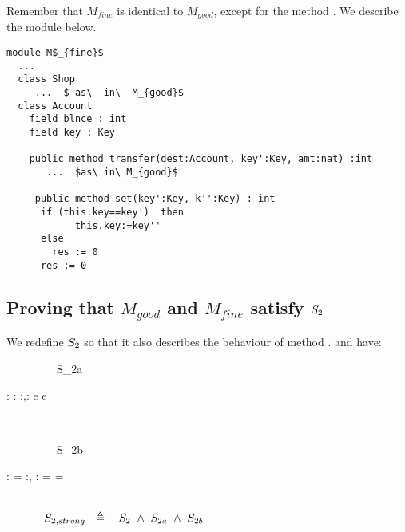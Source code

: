 \noindent
Remember that $M_{fine}$ is identical to $M_{good}$, except for the method . We describe the module below.

\begin{lstlisting}[mathescape=true, language=Chainmail, frame=lines]
module M$_{fine}$
  ...   
  class Shop
     ...  $ as\  in\  M_{good}$
  class Account
    field blnce : int 
    field key : Key
    
    public method transfer(dest:Account, key':Key, amt:nat) :int
       ...  $as\ in\ M_{good}$
	  
     public method set(key':Key, k'':Key) : int
      if (this.key==key')  then
      		this.key:=key''
      else 
        res := 0
      res := 0
\end{lstlisting}

\subsection{Proving that $M_{good}$ and $M_{fine}$ satisfy  $S_2$}
\label{s:extend:spec}

We redefine $S_2$ so that it also describes the behaviour of method . and have:
\\
{\sprepost
		{\strut \ \ \ \ \ \ \ \ \ S_{2a}} 
		{ : \wedge  {}:  \wedge {} { } } %
		 {}
		 {}
		 {:,: }
		 {  {e} }
		 {  {e} }
}
\\
{\sprepost
		{\strut \ \ \ \ \ \ \ \ \ S_{2b}} 
		{ : \wedge {} = }
		 {}
		 {}
		 {:, : }
		 {  = }
		{    = }
}
\\
$\strut  \SPSP  \STwoStrong \ \  \triangleq \ \ \ \STwo \ \wedge \ S_{2a} \ \wedge \ S_{2b} $




